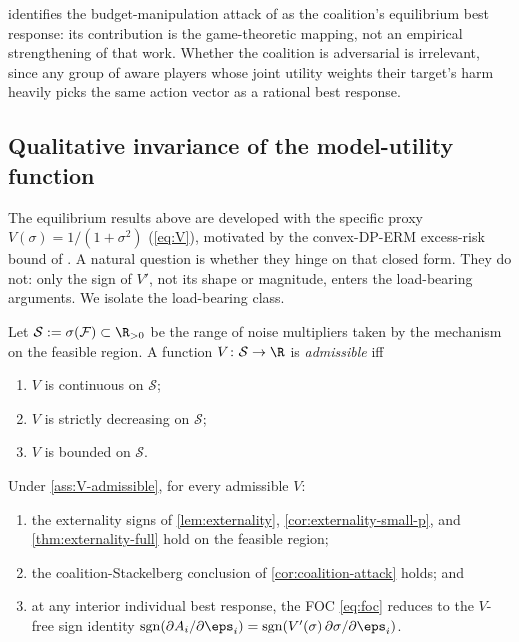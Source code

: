  identifies the budget-manipulation attack
of \citet{kaiser2026your} as the coalition's equilibrium best response:
its contribution is the game-theoretic mapping, not an empirical
strengthening of that work. Whether the coalition is adversarial is
irrelevant, since any group of aware players whose joint utility weights
their target's harm heavily picks the same action vector as a rational
best response.

\subsection{Qualitative invariance of the model-utility function}
\label{sec:V-invariance}

The equilibrium results above are developed with the specific proxy
$V(\sigma) = 1/(1+\sigma^2)$ (\cref{eq:V}), motivated by the convex-DP-ERM
excess-risk bound of \citet{bassily2014private}. A natural question is
whether they hinge on that closed form. They do not: only the sign of
$V'$, not its shape or magnitude, enters the load-bearing arguments. We
isolate the load-bearing class.

\begin{assumption}
\label{ass:V-admissible}
Let $\mathcal S := \sigma(\mathcal F) \subset \R_{>0}$ be the range of
noise multipliers taken by the mechanism on the feasible region. A
function $V \colon \mathcal S \to \R$ is \emph{admissible} iff
\begin{enumerate}
\item[\rm(A1)] $V$ is continuous on $\mathcal S$;
\item[\rm(A2)] $V$ is strictly decreasing on $\mathcal S$;
\item[\rm(A3)] $V$ is bounded on $\mathcal S$.
\end{enumerate}
\end{assumption}

\begin{proposition}
\label{prop:V-invariance}
Under \cref{ass:V-admissible}, for every admissible $V$:
\begin{enumerate}
\item[\rm(i)] the externality signs of \cref{lem:externality},
      \cref{cor:externality-small-p}, and \cref{thm:externality-full}
      hold on the feasible region;
\item[\rm(ii)] the coalition-Stackelberg conclusion of
      \cref{cor:coalition-attack} holds; and
\item[\rm(iii)] at any interior individual best response, the FOC
      \eqref{eq:foc} reduces to the $V$-free sign identity
      $\mathrm{sgn}(\partial A_i/\partial \eps_i)
       = \mathrm{sgn}(V'(\sigma)\,\partial \sigma/\partial \eps_i)$.
\end{enumerate}
\end{proposition}

